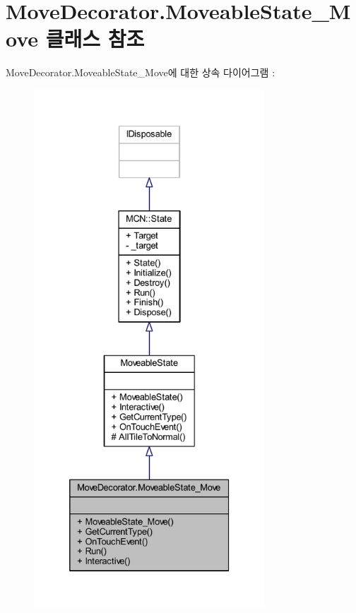 \hypertarget{class_move_decorator_1_1_moveable_state___move}{}\section{Move\+Decorator.\+Moveable\+State\+\_\+\+Move 클래스 참조}
\label{class_move_decorator_1_1_moveable_state___move}


Move\+Decorator.\+Moveable\+State\+\_\+\+Move에 대한 상속 다이어그램 \+: 
\nopagebreak
\begin{figure}[H]
\begin{center}
\leavevmode
\includegraphics[height=550pt]{class_move_decorator_1_1_moveable_state___move__inherit__graph}
\end{center}
\end{figure}


